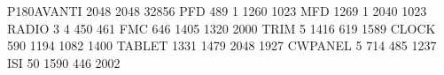 P180AVANTI 2048 2048 32856
PFD	489 1 1260 1023 
MFD	1269 1 2040 1023
RADIO 3 4 450 461
FMC 646 1405 1320 2000
TRIM 5 1416 619 1589
CLOCK 590 1194 1082 1400
TABLET 1331 1479 2048 1927
CWPANEL 5 714 485 1237
ISI 50 1590 446 2002